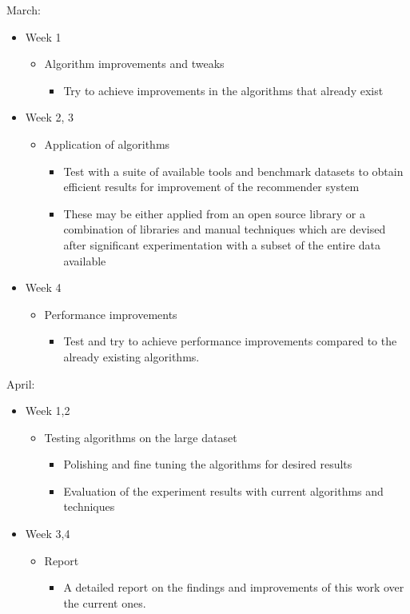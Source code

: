 \documentclass[12pt]{article} %
\begin{document}
March:
\begin{itemize}
\item Week 1
	\begin{itemize}
	\item Algorithm improvements and tweaks
		\begin{itemize}
		\item Try to achieve improvements in the algorithms that already exist
		\end{itemize}
	\end{itemize}
\item Week 2, 3
	\begin{itemize}
	\item Application of algorithms
		\begin{itemize}
		\item Test with a suite of available tools and benchmark datasets to obtain efficient results for improvement of the recommender system
		\item These may be either applied from an open source library or a combination of libraries and manual techniques which are devised after significant experimentation with a  subset of the entire data available
		\end{itemize}
	\end{itemize}
\item Week 4
	\begin{itemize}
	\item Performance improvements
		\begin{itemize}
		\item Test and try to achieve performance improvements compared to the already existing algorithms.
		\end{itemize}
	\end{itemize}
\end{itemize}

April:
\begin{itemize}
\item Week 1,2
	\begin{itemize}
	\item Testing algorithms on the large dataset
		\begin{itemize}
		\item Polishing and fine tuning the algorithms for desired results
		\item Evaluation of the experiment results with current algorithms and techniques
		\end{itemize}
	\end{itemize}
\item Week 3,4
	\begin{itemize}
	\item Report
		\begin{itemize}
		\item A detailed report on the findings and improvements of this work over the current ones.
		\end{itemize}
	\end{itemize}
\end{itemize}
\end{document}
